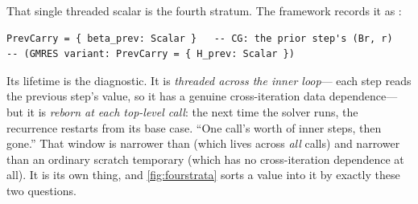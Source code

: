 That single threaded scalar is the fourth stratum. The framework records it as
:

\begin{lstlisting}[style=l4style]
PrevCarry = { beta_prev: Scalar }   -- CG: the prior step's (Br, r)
-- (GMRES variant: PrevCarry = { H_prev: Scalar })
\end{lstlisting}

Its lifetime is the diagnostic. It is \emph{threaded across the inner loop}---
each step reads the previous step's value, so it has a genuine cross-iteration
data dependence---but it is \emph{reborn at each top-level call}: the next time
the solver runs, the recurrence restarts from its base case. ``One call's worth
of inner steps, then gone.'' That window is narrower than  (which
lives across \emph{all} calls) and narrower than an ordinary scratch temporary
(which has no cross-iteration dependence at all). It is its own thing, and
\cref{fig:fourstrata} sorts a value into it by exactly these two questions.

